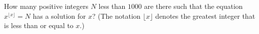 How many positive integers $ N$ less than $ 1000$ are there such that the equation $ x^{\lfloor x\rfloor} = N$ has a solution for $ x$? (The notation $ \lfloor x\rfloor$ denotes the greatest integer that is less than or equal to $ x$.)
